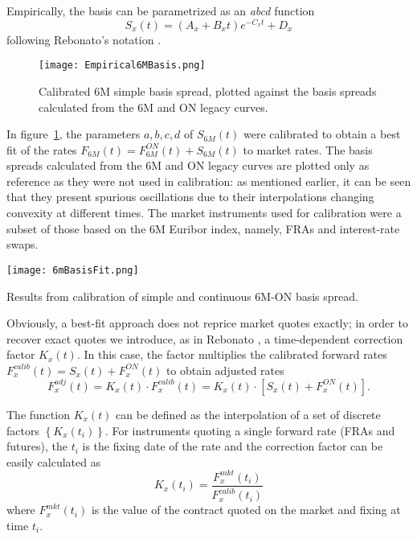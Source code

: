 \documentclass{article}
\begin{document}
Empirically, the basis can be parametrized as an \textit{abcd} function
\begin{equation}
\label{ABCD}
S_x(t) = (A_x + B_x t)e^{-C_x t} + D_x
\end{equation}
following Rebonato's notation \cite{rebonato}.

\begin{figure}[!ht]
\centering
\texttt{[image: Empirical6MBasis.png]}
\caption{Calibrated 6M simple basis spread, plotted against the basis spreads calculated from the 6M and ON legacy curves.}
\label{Empirical6MBasis}
\end{figure}

In figure~\ref{Empirical6MBasis}, the parameters $a,b,c,d$ of $S_{6M}(t)$ were calibrated to obtain a best fit of the rates $F_{6M}(t) = F_{6M}^{ON}(t) + S_{6M}(t)$ to market rates. The basis spreads calculated from the 6M and ON legacy curves are plotted only as reference as they were not used in calibration: as mentioned earlier, it can be seen that they present spurious oscillations due to their interpolations changing convexity at different times. The market instruments used for calibration were a subset of those based on the 6M Euribor index, namely, FRAs and interest-rate swaps.

\begin{table}[p]
\centering
\texttt{[image: 6mBasisFit.png]}
\caption{Results from calibration of simple and continuous 6M-ON basis spread.}
\label{6mBasisFit}
\end{table}

Obviously, a best-fit approach does not reprice market quotes exactly; in order to recover exact quotes we introduce, as in Rebonato \cite{rebonato}, a time-dependent correction factor $K_x(t)$.
In this case, the factor multiplies the calibrated forward rates $F_x^{calib}(t) = S_x(t) + F_x^{ON}(t)$ to obtain adjusted rates $$F_x^{adj}(t) = K_x(t) \cdot F_x^{calib}(t) = K_x(t) \cdot [S_x(t) + F_x^{ON}(t)].$$

The function $K_x(t)$ can be defined as the interpolation of a set of discrete factors $\left\{K_x(t_i)\right\}$. 
For instruments quoting a single forward rate (FRAs and futures), the $t_i$ is the fixing date of the rate and the correction factor can be easily calculated as
\begin{equation}
\label{direct-k}
K_x(t_i) = \frac{F_x^{mkt}(t_i)}{F_x^{calib}(t_i)}
\end{equation}
where $F_x^{mkt}(t_i)$ is the value of the contract quoted on the market and fixing at time $t_i$.
\end{document}
